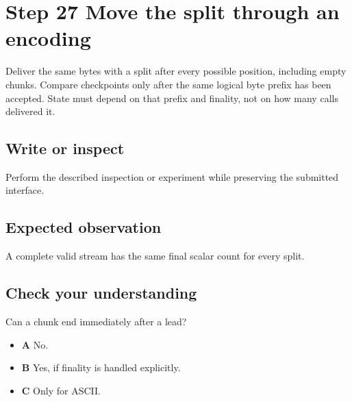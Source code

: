 \section{Step 27 Move the split through an encoding}\label{utf8-s27}

Deliver the same bytes with a split after every possible position, including empty chunks. Compare checkpoints only after the same logical byte prefix has been accepted. State must depend on that prefix and finality, not on how many calls delivered it.

\subsection{Write or inspect}
Perform the described inspection or experiment while preserving the submitted interface.

\subsection{Expected observation}
A complete valid stream has the same final scalar count for every split.

\subsection{Check your understanding}
Can a chunk end immediately after a lead?

\begin{itemize}
  \item \textbf{A} No.
  \item \textbf{B} Yes, if finality is handled explicitly.
  \item \textbf{C} Only for ASCII.
\end{itemize}
